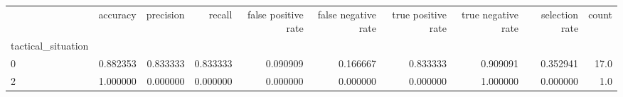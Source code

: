 \begin{tabular}{lrrrrrrrrr}
\toprule
{} &  accuracy &  precision &    recall &  false positive rate &  false negative rate &  true positive rate &  true negative rate &  selection rate &  count \\
tactical\_situation &           &            &           &                      &                      &                     &                     &                 &        \\
\midrule
0                  &  0.882353 &   0.833333 &  0.833333 &             0.090909 &             0.166667 &            0.833333 &            0.909091 &        0.352941 &   17.0 \\
2                  &  1.000000 &   0.000000 &  0.000000 &             0.000000 &             0.000000 &            0.000000 &            1.000000 &        0.000000 &    1.0 \\
\bottomrule
\end{tabular}
